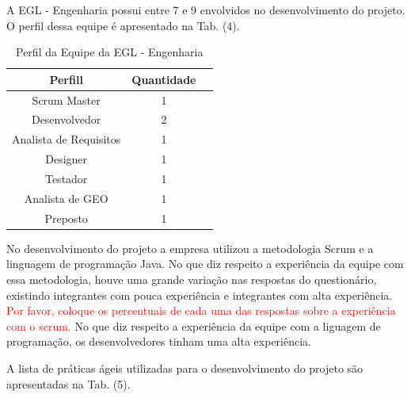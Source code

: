 A EGL - Engenharia possui entre 7 e 9 envolvidos no desenvolvimento do projeto.  O perfil dessa equipe é apresentado na Tab. (4).

\begin{table}[H]
\center
\footnotesize
\begin{tabular}{|c|c|c|}
\hline
\textbf{Perfill}          & \textbf{Quantidade}  \\ \hline
Scrum Master               &  1                  \\ \hline
Desenvolvedor       &  2               \\ \hline
Analista de Requisitos              &   1                \\ \hline
Designer            &   1              \\ \hline
Testador            &  1               \\ \hline
Analista de GEO              &  1               \\ \hline
Preposto   &  1               \\ \hline
\end{tabular}
\caption{Perfil da Equipe da EGL - Engenharia}
\end{table}

\textcolor{red}{}

No desenvolvimento do projeto a empresa utilizou a metodologia Scrum e a linguagem de programação Java. No que diz respeito a experiência da equipe com essa metodologia, houve uma grande variação nas respostas do questionário, existindo integrantes com pouca experiência e integrantes com alta experiência. \textcolor{red}{Por favor, coloque os percentuais de cada uma das respostas sobre a experiência com o scrum.} No que diz respeito a experiência da equipe com a liguagem de programação, os desenvolvedores tinham uma alta experiência.

A lista de práticas ágeis utilizadas para o desenvolvimento do projeto são apresentadas na Tab. (5).

